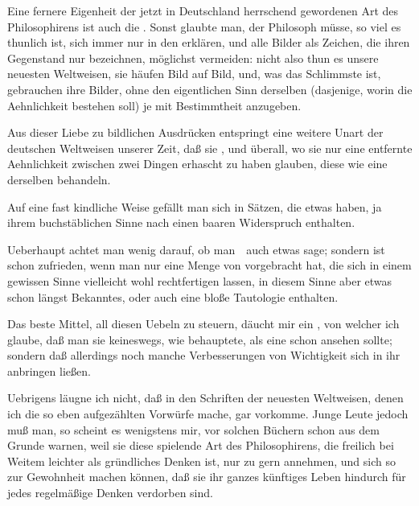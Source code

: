 \begin{aufza}
\begin{aufzb}
\item Eine fernere Eigenheit der jetzt in Deutschland herrschend gewordenen Art des Philosophirens ist auch die . Sonst glaubte man, der Philosoph müsse, so viel es thunlich ist, sich immer nur in den  erklären, und alle Bilder als Zeichen, die ihren Gegenstand nur  bezeichnen, möglichst vermeiden: nicht also thun es unsere neuesten Weltweisen, sie häufen Bild auf Bild, und, was das Schlimmste ist, gebrauchen ihre Bilder, ohne den eigentlichen Sinn derselben (dasjenige, worin die Aehnlichkeit bestehen soll) je mit Bestimmtheit anzugeben.
\item Aus dieser Liebe zu bildlichen Ausdrücken entspringt eine weitere Unart der deutschen Weltweisen unserer Zeit, daß sie , und überall, wo sie nur eine entfernte Aehnlichkeit zwischen zwei Dingen erhascht zu haben glauben, diese wie eine  derselben behandeln.
\item Auf eine fast kindliche Weise gefällt man sich in Sätzen, die etwas  haben, ja ihrem buchstäblichen Sinne nach einen baaren Widerspruch enthalten.
\item Ueberhaupt achtet man wenig darauf, ob man~\ auch etwas  sage; sondern ist schon zufrieden, wenn man nur eine Menge von  vorgebracht hat, die sich in einem gewissen Sinne vielleicht wohl rechtfertigen lassen, in diesem Sinne aber etwas schon längst Bekanntes, oder auch eine bloße Tautologie enthalten.
\end{aufzb}
\item Das beste Mittel, all diesen Uebeln zu steuern, däucht mir ein , von welcher ich glaube, daß man sie keineswegs, wie  behauptete, als eine schon  ansehen sollte; sondern daß allerdings noch manche Verbesserungen von Wichtigkeit sich in ihr anbringen ließen.
\item Uebrigens läugne ich nicht, daß in den Schriften der neuesten Weltweisen, denen ich die so eben aufgezählten Vorwürfe mache, gar  vorkomme. Junge Leute jedoch muß man, so scheint es wenigstens mir, vor solchen Büchern schon aus dem Grunde warnen, weil sie diese spielende Art des Philosophirens, die freilich bei Weitem leichter als gründliches Denken ist, nur zu gern annehmen, und sich so zur Gewohnheit machen können, daß sie ihr ganzes künftiges Leben hindurch für jedes regelmäßige Denken verdorben sind.~
\end{aufza}

